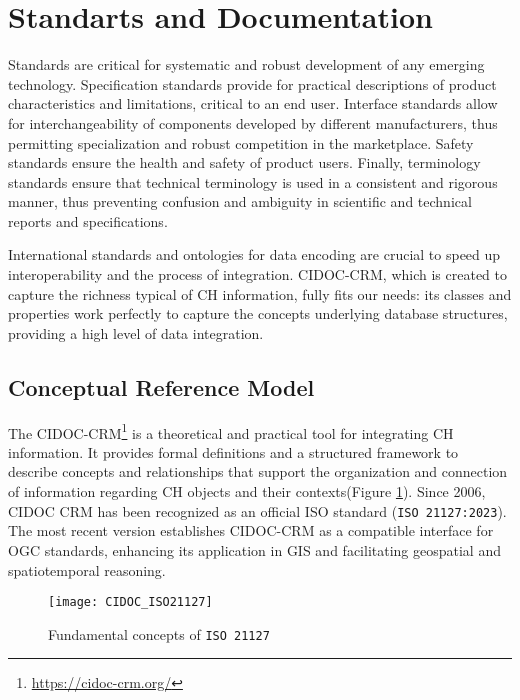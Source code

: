 \section{Standarts and Documentation} 
\label{sub:standart}

Standards are critical for systematic and robust development of any emerging technology. 
Specification standards provide for practical descriptions of product characteristics and limitations, 
critical to an end user. Interface standards allow for interchangeability of components developed by 
different manufacturers, thus permitting specialization and robust competition in the marketplace. 
Safety standards ensure the health and safety of product users. Finally, terminology standards ensure that 
technical terminology is used in a consistent and rigorous manner, thus preventing confusion and 
ambiguity in scientific and technical reports and specifications.
~\cite{hale2014handbook}

International standards and ontologies for data encoding are crucial
to speed up interoperability and the process of integration. \gls{CIDOC-CRM}, which is created to capture the richness typical of CH
information, fully fits our needs: its classes and properties
work perfectly to capture the concepts underlying database structures, providing a high level of data integration.
~\cite{eide2008encoding}



\subsection{ Conceptual Reference Model} 
\label{sec:cidoc}


The \gls{CIDOC-CRM}\footnote{\url{https://cidoc-crm.org/}} is a theoretical and practical tool for integrating \gls{CH} information. It provides formal definitions and a structured framework to describe concepts and relationships that support the organization and connection of information regarding \gls{CH} objects and their contexts(Figure \ref{fig:cidoc}).
Since 2006, CIDOC CRM has been recognized as an official ISO standard (\texttt{ISO 21127:2023}). The most recent version establishes \gls{CIDOC-CRM} as a compatible interface for \gls{OGC} standards, enhancing its application in \gls{GIS} and facilitating geospatial and spatiotemporal reasoning.


\begin{figure}[h!]
    \centering
    \texttt{[image: CIDOC\_ISO21127]}
    \caption{Fundamental concepts of \texttt{ISO 21127} ~\cite{doerr2007cidoc}} %
    \label{fig:cidoc}
\end{figure}
\FloatBarrier

